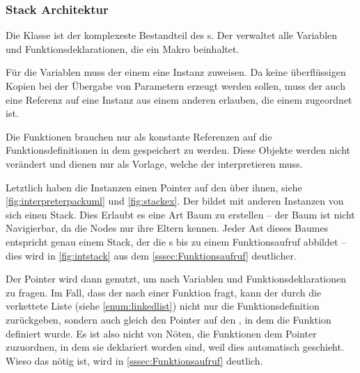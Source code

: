     \subsubsection{Stack Architektur}
    \label{sssec:Stack Architektur}
      Die  Klasse ist der komplexeste Bestandteil des s. Der  verwaltet alle Variablen und Funktionsdeklarationen, die ein Makro beinhaltet.

      Für die Variablen muss der  einem  eine  Instanz zuweisen. Da keine überflüssigen Kopien bei der Übergabe von Parametern erzeugt werden sollen, muss der  auch eine Referenz auf eine  Instanz aus einem anderen  erlauben, die einem  zugeordnet ist.

      Die Funktionen brauchen nur als konstante Referenzen auf die Funktionsdefinitionen in dem  gespeichert zu werden. Diese Objekte werden nicht verändert und dienen nur als Vorlage, welche der  interpretieren muss.

      Letztlich haben die  Instanzen einen Pointer auf den  über ihnen, siehe \autoref{fig:interpreterpackuml} und \autoref{fig:stackex}. Der  bildet mit anderen Instanzen von sich einen Stack. Dies Erlaubt es eine Art Baum zu erstellen -- der Baum ist nicht Navigierbar, da die Nodes nur ihre Eltern kennen. Jeder Ast dieses Baumes entspricht genau einem Stack, der die s bis zu einem Funktionsaufruf abbildet -- dies wird in \autoref{fig:intstack} aus dem \autoref{sssec:Funktionsaufruf} deutlicher.

      Der Pointer wird dann genutzt, um nach Variablen und Funktionsdeklarationen zu fragen. Im Fall, dass der  nach einer Funktion fragt, kann der  durch die verkettete Liste (siehe \ref{enum:linkedlist}) nicht nur die Funktionsdefinition zurückgeben, sondern auch gleich den Pointer auf den , in dem die Funktion definiert wurde. Es ist also nicht von Nöten, die Funktionen dem  Pointer zuzuordnen, in dem sie deklariert worden sind, weil dies automatisch geschieht. Wieso das nötig ist, wird in \autoref{sssec:Funktionsaufruf} deutlich.

